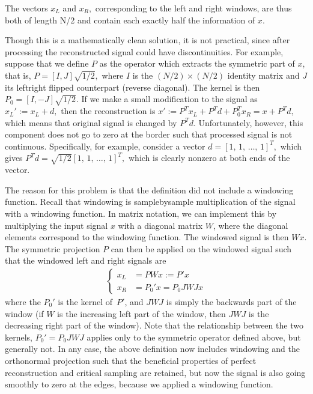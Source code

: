 \documentclass[letterpaper,10pt,english]{jupyterBook}
\begin{document}
\sphinxAtStartPar
The vectors \(x_{L}\) and \(x_{R},\) corresponding to the
left and right windows, are thus both of length N/2 and contain each
exactly half the information of \(x\).

\sphinxAtStartPar
Though this is a mathematically clean solution, it is not practical,
since after processing the reconstructed signal could have
discontinuities. For example, suppose that we define \(P\) as the operator
which extracts the symmetric part of \(x\), that is, \( P = [I,
J]\sqrt{1/2}, \) where \(I\) is the \((N/2)\times(N/2)\) identity matrix and
\(J\) its left\sphinxhyphen{}right flipped counterpart (reverse diagonal). The kernel is
then \( P_0 = [I, -J]\sqrt{1/2}. \) If we make a small modification
to the signal as \( x_L':=x_L+d, \) then the reconstruction is \(
x':=P^Tx_L+P^Td+P_0^Tx_R=x+P^Td, \) which means that original signal is
changed by \(P^Td\). Unfortunately, however, this component does
not go to zero at the border such that processed signal is not
continuous. Specifically, for example, consider a vector \( d =
[1,\,1,\,\dotsc,\,1]^T, \) which gives \( P^Td =
\sqrt{1/2}[1,\,1,\,\dotsc,\,1]^T, \) which is clearly non\sphinxhyphen{}zero
at both ends of the vector.

\sphinxAtStartPar
The reason for this problem is that the definition did not include a
windowing function. Recall that windowing is sample\sphinxhyphen{}by\sphinxhyphen{}sample
multiplication of the signal with a windowing function. In matrix
notation, we can implement this by multiplying the input signal \(x\) with
a diagonal matrix \(W\), where the diagonal elements correspond to the
windowing function. The windowed signal is then \(Wx\). The symmetric
projection \(P\) can then be applied on the windowed signal such that the
windowed left and right signals are
\begin{equation*}
\begin{split} 
\begin{cases} x_L &= PWx := P'x\\ x_R &= P_0'x = P_0JWJx
\end{cases} 
\end{split}
\end{equation*}
\sphinxAtStartPar
where the \(P_{0}'\) is the kernel of \(P'\), and \(JWJ\) is simply
the backwards part of the window (if \(W\) is the increasing left part of
the window, then \(JWJ\) is the decreasing right part of the window). Note
that the relationship between the two kernels, \( P_0'=P_0JWJ \)
applies only to the symmetric operator defined above, but generally not.
In any case, the above definition now includes windowing and the
orthonormal projection such that the beneficial properties of perfect
reconstruction and critical sampling are retained, but now the signal is
also going smoothly to zero at the edges, because we applied a windowing
function.
\end{document}
